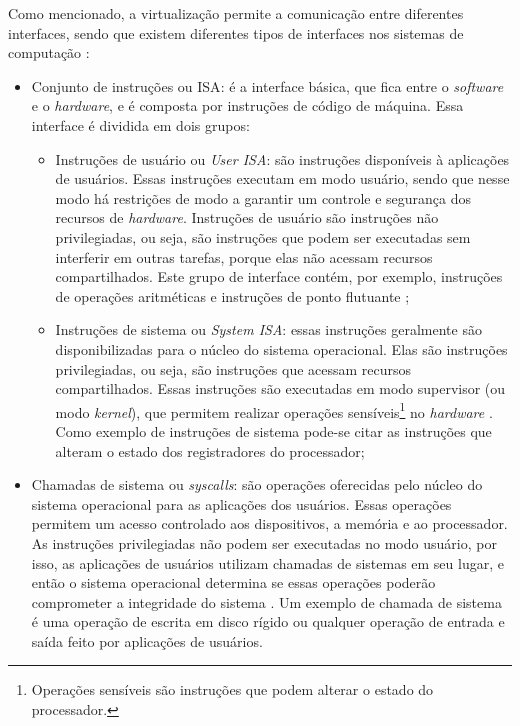 Como mencionado, a virtualização permite a comunicação entre diferentes interfaces, sendo que existem diferentes tipos de interfaces
nos sistemas de computação \cite{maziero2013}:
\begin{itemize}
 \item Conjunto de instruções ou \ac{ISA}: é a interface básica, que fica entre o \textit{software} e o \textit{hardware}, e é composta por 
 instruções de código de máquina. Essa interface é dividida em dois grupos:
 \begin{itemize}
  \item Instruções de usuário ou \textit{User \ac{ISA}}: são instruções disponíveis à aplicações de usuários. Essas instruções executam em 
  modo usuário, sendo que nesse modo há restrições de modo a garantir um controle e segurança dos recursos de \textit{hardware}. Instruções de 
  usuário são instruções não privilegiadas, ou seja, são instruções que podem ser executadas sem interferir em outras tarefas, porque elas não 
  acessam recursos compartilhados. Este grupo de interface contém, por exemplo, instruções de operações aritméticas e instruções de ponto flutuante 
  \cite{buyya2013};
  \item Instruções de sistema ou \textit{System \ac{ISA}}: essas instruções geralmente são disponibilizadas para o núcleo do sistema operacional. 
  Elas são instruções privilegiadas, ou seja, são instruções que acessam recursos compartilhados. Essas instruções são executadas em modo 
  supervisor (ou modo \textit{kernel}), que permitem realizar operações sensíveis\footnote{Operações sensíveis são instruções que podem alterar o 
  estado do processador.} no \textit{hardware} \cite{buyya2013}. Como exemplo de instruções de sistema pode-se citar as instruções que alteram 
  o estado dos registradores do processador; %
 \end{itemize}
 \item Chamadas de sistema ou \textit{syscalls}: são operações oferecidas pelo núcleo do sistema operacional para as aplicações dos usuários.
 Essas operações permitem um acesso controlado aos dispositivos, a memória e ao processador. 
 As instruções privilegiadas não podem ser executadas no modo usuário, por isso, as aplicações de usuários utilizam chamadas de sistemas em seu 
 lugar, e então o sistema operacional determina se essas operações poderão comprometer a integridade do sistema \cite{marinescu2013}.
 Um exemplo de chamada de sistema é uma operação de escrita em disco rígido ou qualquer operação de entrada e saída feito por aplicações de usuários.
\end{itemize}


